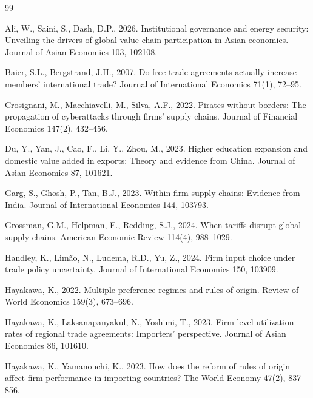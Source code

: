 \documentclass[preprint,12pt,authoryear]{elsarticle}
\begin{document}

\begin{thebibliography}{99}

Ali, W., Saini, S., Dash, D.P., 2026. Institutional governance and energy security: Unveiling the drivers of global value chain participation in Asian economies. Journal of Asian Economics 103, 102108.

Baier, S.L., Bergstrand, J.H., 2007. Do free trade agreements actually increase members' international trade? Journal of International Economics 71(1), 72--95.

Crosignani, M., Macchiavelli, M., Silva, A.F., 2022. Pirates without borders: The propagation of cyberattacks through firms' supply chains. Journal of Financial Economics 147(2), 432--456.

Du, Y., Yan, J., Cao, F., Li, Y., Zhou, M., 2023. Higher education expansion and domestic value added in exports: Theory and evidence from China. Journal of Asian Economics 87, 101621.

Garg, S., Ghosh, P., Tan, B.J., 2023. Within firm supply chains: Evidence from India. Journal of International Economics 144, 103793.

Grossman, G.M., Helpman, E., Redding, S.J., 2024. When tariffs disrupt global supply chains. American Economic Review 114(4), 988--1029.

Handley, K., Lim\~ao, N., Ludema, R.D., Yu, Z., 2024. Firm input choice under trade policy uncertainty. Journal of International Economics 150, 103909.

Hayakawa, K., 2022. Multiple preference regimes and rules of origin. Review of World Economics 159(3), 673--696.

Hayakawa, K., Laksanapanyakul, N., Yoshimi, T., 2023. Firm-level utilization rates of regional trade agreements: Importers' perspective. Journal of Asian Economics 86, 101610.

Hayakawa, K., Yamanouchi, K., 2023. How does the reform of rules of origin affect firm performance in importing countries? The World Economy 47(2), 837--856.


\end{thebibliography}
\end{document}
